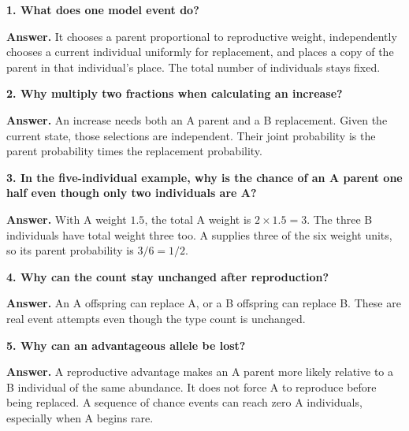 \begin{checkpoint}
\textbf{1. What does one model event do?}

\textbf{Answer.} It chooses a parent proportional to reproductive weight,
independently chooses a current individual uniformly for replacement, and
places a copy of the parent in that individual's place. The total number
of individuals stays fixed.

\textbf{2. Why multiply two fractions when calculating an increase?}

\textbf{Answer.} An increase needs both an A parent and a B replacement.
Given the current state, those selections are independent. Their joint
probability is the parent probability times the replacement probability.

\textbf{3. In the five-individual example, why is the chance of an A parent
one half even though only two individuals are A?}

\textbf{Answer.} With A weight \(1.5\), the total A weight is
\(2\times1.5=3\). The three B individuals have total weight three too.
A supplies three of the six weight units, so its parent probability is
\(3/6=1/2\).

\textbf{4. Why can the count stay unchanged after reproduction?}

\textbf{Answer.} An A offspring can replace A, or a B offspring can replace
B. These are real event attempts even though the type count is unchanged.

\textbf{5. Why can an advantageous allele be lost?}

\textbf{Answer.} A reproductive advantage makes an A parent more likely
relative to a B individual of the same abundance. It does not force A to
reproduce before being replaced. A sequence of chance events can reach zero
A individuals, especially when A begins rare.
\end{checkpoint}


